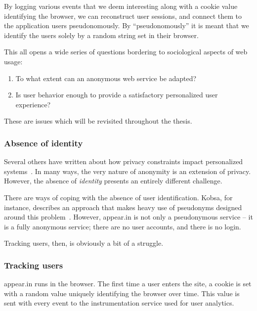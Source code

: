 By logging various events that we deem interesting along with a cookie value identifying the browser, we can reconstruct user sessions, and connect them to the application users pseudonomously. By ``pseudonomously'' it is meant that we identify the users solely by a random string set in their browser.

This all opens a wide series of questions bordering to sociological aspects of web usage:

\begin{enumerate}
  \item
    To what extent can an anonymous web service be adapted?
  \item
    Is user behavior enough to provide a satisfactory personalized user experience?
\end{enumerate}

These are issues which will be revisited throughout the thesis.

\subsubsection{Absence of identity} %

Several others have written about how privacy constraints impact personalized systems~\cite{Teltzrow2004,Kobsa2007}. In many ways, the very nature of anonymity is an extension of privacy. However, the absence of \emph{identity} presents an entirely different challenge.

There are ways of coping with the absence of user identification. Kobsa, for instance, describes an approach that makes heavy use of pseudonyms designed around this problem~\cite{Kobsa2003}.
However, appear.in is not only a pseudonymous service -- it is a fully anonymous service; there are no user accounts, and there is no login.

Tracking users, then, is obviously a bit of a struggle.

\subsubsection{Tracking users}
\label{intro:sub:tracking_users}

appear.in runs in the browser. The first time a user enters the site, a cookie is set with a random value uniquely identifying the browser over time. This value is sent with every event to the instrumentation service used for user analytics.

